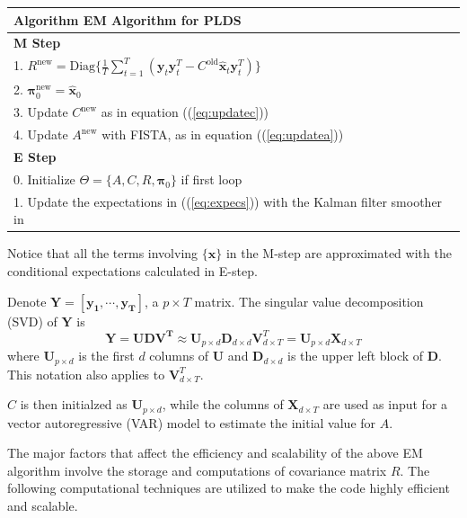 \documentclass[fleqn]{article}
\let\oldref\ref
\renewcommand{\ref}[1]{(\oldref{#1})}
\newcommand{\T}{T}
\begin{document}
\begin{tabular}{l}
\hline
\textbf{Algorithm } EM Algorithm for PLDS\\
\hline
\textbf{M Step}\\
1. $R^{\text{new}}=\text{Diag}\biggl\{\frac{1}{T}\sum\limits_{t=1}^{T}(\mathbf{y}_t\mathbf{y}_t^{\T}-C^{\text{old}} \hat{\mathbf{x}}_t\mathbf{y}_t^{\T})\biggr\}$\\
2. $\mathbf{\pi}_0^{\text{new}}=\hat{\mathbf{x}}_0$\\
3. Update $C^{\text{new}}$ as in equation \ref{eq:updatec}\\
4. Update $A^{\text{new}}$ with FISTA, as in equation \ref{eq:updatea}\\
\hline
\textbf{E Step}\\
0. Initialize $\Theta =\{A,C,R,\mathbf{\pi}_0\}$ if first loop\\
1. Update the expectations in \ref{eq:expecs} with the Kalman filter smoother in \nameref{sec:appendix1}\\
\hline
\end{tabular}

Notice that all the terms involving $\{\mathbf{x}\}$ in the M-step are approximated with the conditional expectations calculated in E-step.

Denote $\mathbf{Y} = \left[\mathbf{y_1},\cdots,\mathbf{y_T}\right]$, a $p\times T$ matrix. The singular value decomposition (SVD) of $\mathbf{Y}$ is
\begin{equation}\label{eq:initial}
    \mathbf{Y} = \mathbf{UDV^{\T}} \approx \mathbf{U}_{p \times d} \mathbf{D}_{d \times d} \mathbf{V}_{d \times T}^{\T} =\mathbf{U}_{p\times d}\mathbf{X}_{d \times T}
\end{equation}
where $\mathbf{U}_{p \times d}$ is the first $d$ columns of $\mathbf{U}$ and $\mathbf{D}_{d\times d}$ is the upper left block of $\mathbf{D}$. This notation also applies to $\mathbf{V}^{\T}_{d \times T}$.

$C$ is then initialzed as $\mathbf{U}_{p\times d}$, while the columns of $\mathbf{X}_{d \times T}$ are used as input for a vector autoregressive (VAR) model to estimate the initial value for $A$.

The major factors that affect the efficiency and scalability of the above EM algorithm involve the storage and computations of covariance matrix $R$. The following computational techniques are utilized to make the code highly efficient and scalable.
\end{document}

